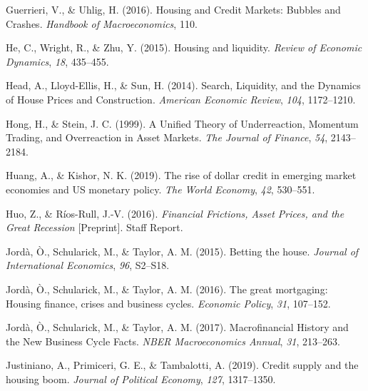 \documentclass[
  12pt,
]{article}
\newlength{\cslhangindent}
\newlength{\cslentryspacingunit} %
\newenvironment{CSLReferences}[2] %
 {%
  \setlength{\parindent}{0pt}
  \ifodd #1
  \let\oldpar\par
  \def\par{\hangindent=\cslhangindent\oldpar}
  \fi
  \setlength{\parskip}{#2\cslentryspacingunit}
 }%
 {}
\begin{document}
\begin{CSLReferences}{1}{0}
\leavevmode{}%
Guerrieri, V., \& Uhlig, H. (2016). Housing and {Credit Markets}: Bubbles and {Crashes}. \emph{Handbook of Macroeconomics}, 110.

\leavevmode{}%
He, C., Wright, R., \& Zhu, Y. (2015). Housing and liquidity. \emph{Review of Economic Dynamics}, \emph{18}, 435--455.

\leavevmode{}%
Head, A., Lloyd-Ellis, H., \& Sun, H. (2014). Search, {Liquidity}, and the {Dynamics} of {House Prices} and {Construction}. \emph{American Economic Review}, \emph{104}, 1172--1210.

\leavevmode{}%
Hong, H., \& Stein, J. C. (1999). A {Unified Theory} of {Underreaction}, {Momentum Trading}, and {Overreaction} in {Asset Markets}. \emph{The Journal of Finance}, \emph{54}, 2143--2184.

\leavevmode{}%
Huang, A., \& Kishor, N. K. (2019). The rise of dollar credit in emerging market economies and {US} monetary policy. \emph{The World Economy}, \emph{42}, 530--551.

\leavevmode{}%
Huo, Z., \& Ríos-Rull, J.-V. (2016). \emph{Financial {Frictions}, {Asset Prices}, and the {Great Recession}} {[}Preprint{]}. {Staff Report}.

\leavevmode{}%
Jordà, Ò., Schularick, M., \& Taylor, A. M. (2015). Betting the house. \emph{Journal of International Economics}, \emph{96}, S2--S18.

\leavevmode{}%
Jordà, Ò., Schularick, M., \& Taylor, A. M. (2016). The great mortgaging: Housing finance, crises and business cycles. \emph{Economic Policy}, \emph{31}, 107--152.

\leavevmode{}%
Jordà, Ò., Schularick, M., \& Taylor, A. M. (2017). Macrofinancial {History} and the {New Business Cycle Facts}. \emph{NBER Macroeconomics Annual}, \emph{31}, 213--263.

\leavevmode{}%
Justiniano, A., Primiceri, G. E., \& Tambalotti, A. (2019). Credit supply and the housing boom. \emph{Journal of Political Economy}, \emph{127}, 1317--1350.


\end{CSLReferences}
\end{document}
